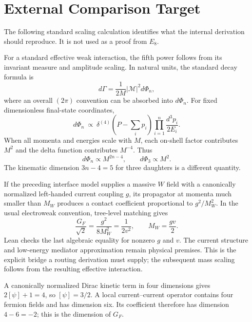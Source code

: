 \section{External Comparison Target}
\label{app:weak_comparison}
The following standard scaling calculation identifies what the internal derivation should reproduce. It is not used as a proof from $E_8$.

For a standard effective weak interaction, the fifth power follows from its invariant measure and amplitude scaling. In natural units, the standard decay formula is\cite{navas_review_2024}
\begin{equation}
d\Gamma=\frac{1}{2M}|\mathcal M|^2d\Phi_n,
\end{equation}
where an overall $(2\pi)$ convention can be absorbed into $d\Phi_n$. For fixed dimensionless final-state coordinates,
\begin{equation}
d\Phi_n\ \propto\ \delta^{(4)}\!\left(P-\sum_i p_i\right)
\prod_{i=1}^n\frac{d^3p_i}{2E_i}.
\end{equation}
When all momenta and energies scale with $M$, each on-shell factor contributes $M^2$ and the delta function contributes $M^{-4}$. Thus
\begin{equation}
d\Phi_n\propto M^{2n-4},\qquad d\Phi_3\propto M^2.
\end{equation}
The kinematic dimension $3n-4=5$ for three daughters is a different quantity.

If the preceding interface model supplies a massive $W$ field with a canonically normalized left-handed current coupling $g$, its propagator at momenta much smaller than $M_W$ produces a contact coefficient proportional to $g^2/M_W^2$. In the usual electroweak convention, tree-level matching gives
\begin{equation}
\frac{G_F}{\sqrt2}=\frac{g^2}{8M_W^2}
=\frac{1}{2v^2},\qquad M_W=\frac{gv}{2}.
\end{equation}
Lean checks the last algebraic equality for nonzero $g$ and $v$. The current structure and low-energy mediator approximation remain physical premises. This is the explicit bridge a routing derivation must supply; the subsequent mass scaling follows from the resulting effective interaction.

A canonically normalized Dirac kinetic term in four dimensions gives $2[\psi]+1=4$, so $[\psi]=3/2$. A local current--current operator contains four fermion fields and has dimension six. Its coefficient therefore has dimension $4-6=-2$; this is the dimension of $G_F$.


